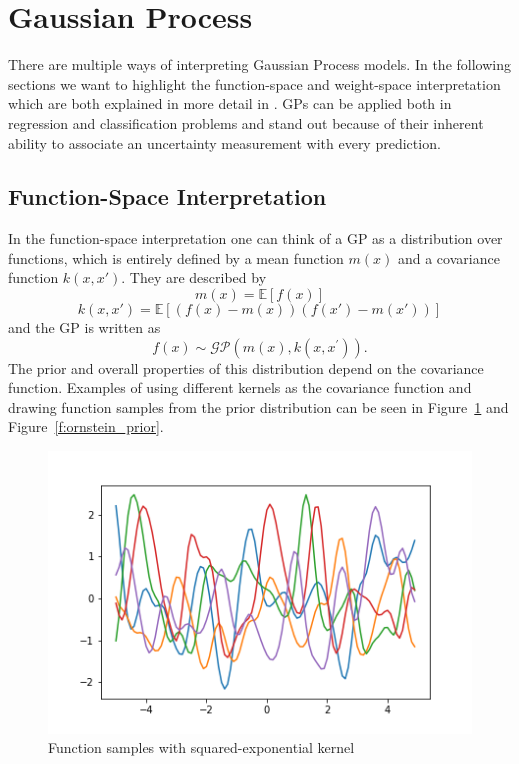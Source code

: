 \section{Gaussian Process}
There are multiple ways of interpreting Gaussian Process models. In the following sections we want to highlight the function-space and weight-space interpretation which are both explained in more detail in \cite{GP_for_ML}. GPs can be applied both in regression and classification problems and stand out because of their inherent ability to associate an uncertainty measurement with every prediction.

\subsection{Function-Space Interpretation}
    In the function-space interpretation one can think of a GP as a distribution over functions, which is entirely defined by a mean function $m(x)$ and a covariance function $k(x,x')$. They are described by
        $$
        m(x) =\mathbb{E}[f(x)]
        $$
        $$
        k(x,x') = \mathbb{E}[(f(x)-m(x))(f(x')-m(x'))]
        $$
    and the GP is written as
        $$
        f({x}) \sim \mathcal{G} \mathcal{P}\left(m({x}), k\left({x}, {x}^{\prime}\right)\right).
        $$
    The prior and overall properties of this distribution depend on the covariance function. Examples of using different kernels as the covariance function and drawing function samples from the prior distribution can be seen in Figure~\ref{f:squared-exponential_prior} and Figure~\ref{f:ornstein_prior}.
    \begin{figure}[ht]
        \centering
        \includegraphics[width=.9\linewidth]{SoM_report_template/figures/prior.png}
        \caption[Prior with squared-exponential kernel]{\label{f:squared-exponential_prior}Function samples with squared-exponential kernel}
        \end{figure}
